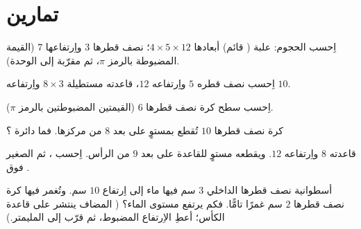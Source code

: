 \section{تمارين}

\begin{exercise}[$\star$]\label{exo:g9:solids:1}
اِحسب الحجوم: علبة ( قائم) أبعادها $4 \times 5
\times 12$؛  نصف قطرها $3$ واِرتفاعها $7$ (القيمة
المضبوطة بالرمز $\pi$، ثم مقرّبة إلى الوحدة).
\end{exercise}

\begin{exercise}[$\star$]\label{exo:g9:solids:2}
اِحسب   نصف قطره $5$ واِرتفاعه $12$، 
قاعدته مستطيلة $8 \times 3$ واِرتفاعه $10$.
\end{exercise}

\begin{exercise}[$\star$]\label{exo:g9:solids:3}
اِحسب   سطح كرة نصف قطرها $6$ (القيمتين
المضبوطتين بالرمز $\pi$).
\end{exercise}

\begin{exercise}[$\star$]\label{exo:g9:solids:4}
كرة نصف قطرها $10$ تُقطع بمستوٍ على بعد $8$ من مركزها. فما
 دائرة ؟
\end{exercise}

\begin{exercise}[$\star\star$]\label{exo:g9:solids:5}
  قاعدته $8$ واِرتفاعه $12$. ويقطعه مستوٍ 
للقاعدة على بعد $9$ من الرأس. اِحسب  ، ثم 
 الصغير فوق .
\end{exercise}

\begin{exercise}[$\star\star$]\label{exo:g9:solids:6}
 أسطوانية نصف قطرها الداخلي $3$ سم فيها ماء إلى اِرتفاع
$10$ سم. وتُغمر فيها كرة نصف قطرها $2$ سم غمرًا تامًّا. فكم
يرتفع مستوى الماء؟ ( المضاف ينتشر على  قاعدة
الكأس؛ أعطِ الاِرتفاع المضبوط، ثم قرّب إلى المليمتر.)
\end{exercise}

